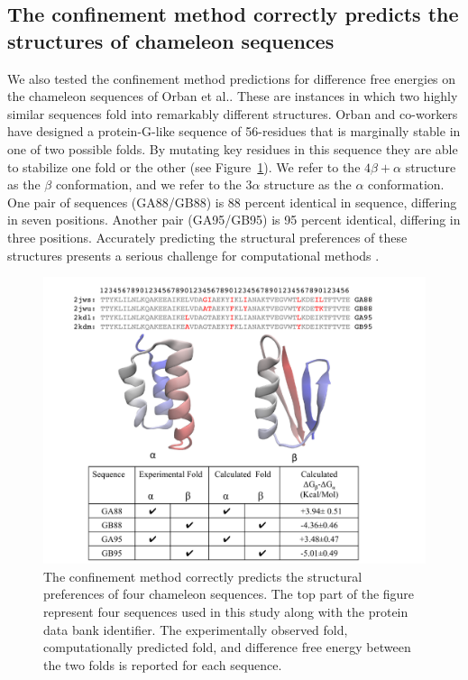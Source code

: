 \documentclass[12pt]{article}
\begin{document}
\subsection*{The confinement method correctly predicts the structures of chameleon sequences}

We also tested the confinement method predictions for difference free energies on the chameleon sequences of Orban et
al.\cite{Alexander2007,He2008,Alexander2009,Bryan2010,He2012}. These are instances in which two highly
similar sequences fold into remarkably different structures. Orban and co-workers have designed a protein-G-like
sequence of 56-residues that is marginally stable in one of two possible folds. By mutating key residues in this
sequence they are able to stabilize one fold or the other (see Figure~\ref{fig:orban}). We refer to the $4\beta +
\alpha$ structure as the $\beta$ conformation, and we refer to the $3\alpha$ structure as the $\alpha$ conformation. One
pair of sequences (GA88/GB88) is 88 percent identical in sequence, differing in seven positions. Another pair
(GA95/GB95) is 95 percent identical, differing in three positions. Accurately predicting the structural preferences of
these structures presents a serious challenge for computational
methods \cite{Allison2011}. 

\begin{figure}
    \begin{center}
    \includegraphics[width=5.0in]{orban.pdf}
    \end{center}
    \caption{The confinement method correctly predicts the structural preferences of four chameleon sequences. The top
        part of the figure represent four sequences used in this study along with the protein data bank identifier. The
        experimentally observed fold, computationally predicted fold, and difference free energy between the two folds
        is reported for each sequence.}
\label{fig:orban}
\end{figure}
\end{document}
